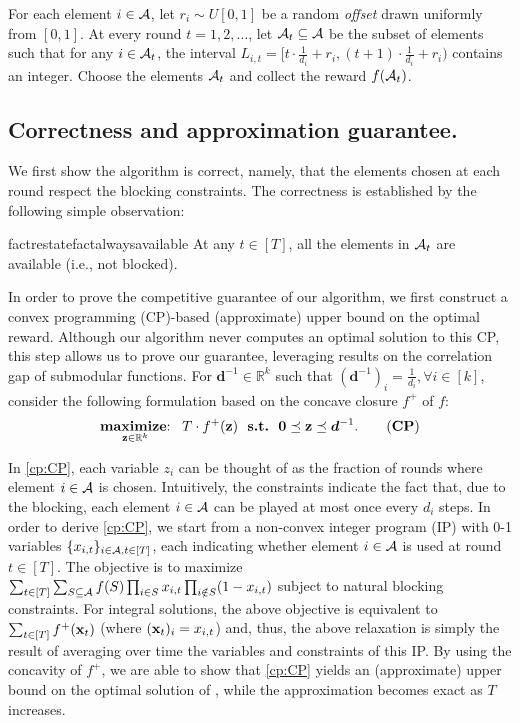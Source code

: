 \begin{algorithm}[\is (\IS)]
For each element $i \in \operatorname{\mathcal{A}}$, let $r_i \sim U[0,1]$ be a random {\em offset} drawn uniformly from $[0,1]$. 
At every round $t = 1, 2, \dots$,  let $\operatorname{\mathcal{A}}_t \subseteq \operatorname{\mathcal{A}}$ be the subset of elements such that for any $i \in \operatorname{\mathcal{A}}_t$, the interval $L_{i,t} = [t\cdot \frac{1}{d_i} + r_i, (t+1) \cdot \frac{1}{d_i} + r_i)$ contains an integer. Choose the elements $\operatorname{\mathcal{A}}_t$ and collect the reward $f(\operatorname{\mathcal{A}}_t)$.
\end{algorithm}


\subsection{Correctness and approximation guarantee.} 
We first show the algorithm is correct, namely, that the elements chosen at each round respect the blocking constraints. The correctness is established by the following simple observation:

\begin{restatable}{fact}{restatefactalwaysavailable}\label{inter:fact:alwaysavailable}
At any $t \in [T]$, all the elements in $\operatorname{\mathcal{A}}_t$ are available (i.e., not blocked).
\end{restatable}

In order to prove the competitive guarantee of our algorithm, we first construct a convex programming (CP)-based (approximate) upper bound on the optimal reward. Although our algorithm never computes an optimal solution to this CP, this step allows us to prove our guarantee, leveraging results on the correlation gap of submodular functions. For $\bm{d}^{-1} \in \mathbb{R}^k$ such that $(\bm{d}^{-1})_i = \frac{1}{d_i}, \forall i \in [k]$, consider the following formulation based on the concave closure $f^+$ of $f$:
\begin{align}
\maximize_{\z \in \mathbb{R}^k}~~ T \cdot f^+(\z)~~\textbf{s.t.}~~ \bm{0} \preceq \z \preceq \bm{d}^{-1}. \tag{\textbf{CP}} \label{cp:CP}
\end{align}

In \eqref{cp:CP}, each variable $z_{i}$ can be thought of as the fraction of rounds where element $i\in \operatorname{\mathcal{A}}$ is chosen. Intuitively, the constraints indicate the fact that, due to the blocking, each element $i \in \operatorname{\mathcal{A}}$ can be played at most once every $d_i$ steps. 
In order to derive \eqref{cp:CP}, we start from a non-convex integer program (IP) with 0-1 variables $\{x_{i,t}\}_{i \in \operatorname{\mathcal{A}}, t \in [T]}$, each indicating whether element $i \in \operatorname{\mathcal{A}}$ is used at round $t \in [T]$. The objective is to maximize $\sum_{t \in [T]} \sum_{S \subseteq \operatorname{\mathcal{A}}} f(S) \prod_{i \in S} x_{i,t} \prod_{i \notin S}(1 - x_{i,t})$ subject to natural blocking constraints. For integral solutions, the above objective is equivalent to $\sum_{t \in [T]} f^+(\operatorname{\mathbf{x}}_t)$ (where $(\operatorname{\mathbf{x}}_t)_i = x_{i,t}$) and, thus, the above relaxation is simply the result of averaging over time the variables and constraints of this IP. By using the concavity of $f^+$, we are able to show that \eqref{cp:CP} yields an (approximate) upper bound on the optimal solution of \rsm, while the approximation becomes exact as $T$ increases.

